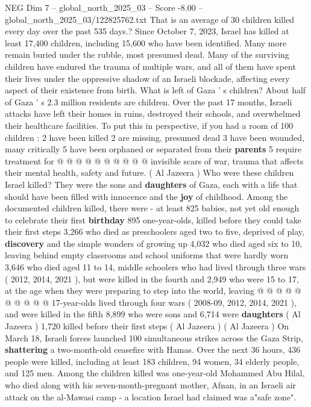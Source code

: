 \begin{textsample}{NEG Dim 7 – global\_north\_2025\_03 – Score -8.00 – global\_north\_2025\_03/122825762.txt}  \label{ex:f7_neg_126}
That is an average of 30 children killed every day over the past 535 days.?
Since October 7, 2023, Israel has killed at least 17,400 children, including 15,600 who have been identified.
Many more remain buried under the rubble, most presumed dead.
Many of the surviving children have endured the trauma of multiple wars, and all of them have spent their lives under the oppressive shadow of an Israeli blockade, affecting every aspect of their existence from birth.
What is left of Gaza ' s children?
About half of Gaza ' s 2.3 million residents are children.
Over the past 17 months, Israeli attacks have left their homes in ruins, destroyed their schools, and overwhelmed their healthcare facilities.
To put this in perspective, if you had a room of 100 children : 2 have been killed 2 are missing, presumed dead 3 have been wounded, many critically 5 have been orphaned or separated from their \textbf{parents} 5 require treatment for @ @ @ @ @ @ @ @ @ @ invisible scars of war, trauma that affects their mental health, safety and future. ( Al Jazeera ) Who were these children Israel killed?
They were the sons and \textbf{daughters} of Gaza, each with a life that should have been filled with innocence and the \textbf{joy} of childhood.
Among the documented children killed, there were - at least 825 babies, not yet old enough to celebrate their first \textbf{birthday} 895 one-year-olds, killed before they could take their first steps 3,266 who died as preschoolers aged two to five, deprived of play, \textbf{discovery} and the simple wonders of growing up 4,032 who died aged six to 10, leaving behind empty classrooms and school uniforms that were hardly worn 3,646 who died aged 11 to 14, middle schoolers who had lived through three wars ( 2012, 2014, 2021 ), but were killed in the fourth and 2,949 who were 15 to 17, at the age when they were preparing to step into the world, leaving @ @ @ @ @ @ @ @ @ @ 17-year-olds lived through four wars ( 2008-09, 2012, 2014, 2021 ), and were killed in the fifth 8,899 who were sons and 6,714 were \textbf{daughters} ( Al Jazeera ) 1,720 killed before their first steps ( Al Jazeera ) ( Al Jazeera ) On March 18, Israeli forces launched 100 simultaneous strikes across the Gaza Strip, \textbf{shattering} a two-month-old ceasefire with Hamas.
Over the next 36 hours, 436 people were killed, including at least 183 children, 94 women, 34 elderly people, and 125 men.
Among the children killed was one-year-old Mohammed Abu Hilal, who died along with his seven-month-pregnant mother, Afnan, in an Israeli air attack on the al-Mawasi camp - a location Israel had claimed was a"safe zone".

\end{textsample}
